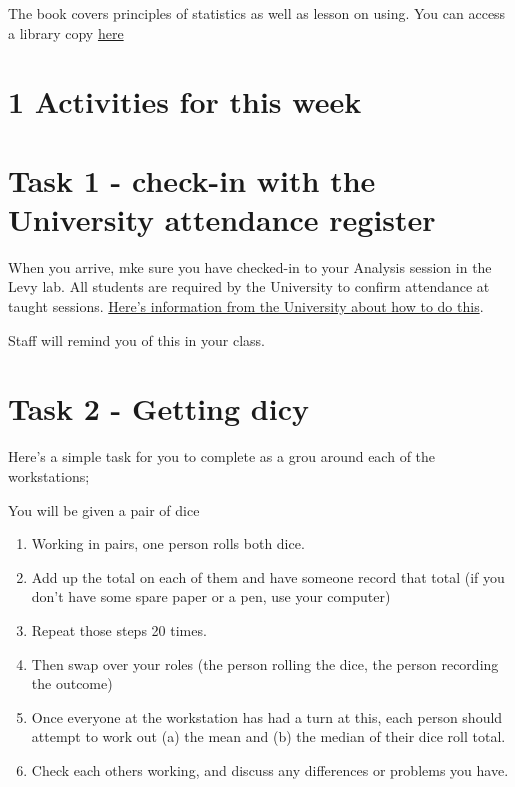 \documentclass[
]{book}
\begin{document}
The book covers principles of statistics as well as lesson on using. You
can access a library copy
\href{https://onesearch.lancaster-university.uk/permalink/f/cssk39/44LAN_ALMA_DS51180136050001221}{here}\\

\hypertarget{activities-for-this-week}{%
\section{1 Activities for this week}\label{activities-for-this-week}}

\hypertarget{task-1---check-in-with-the-university-attendance-register}{%
\section{Task 1 - check-in with the University attendance register}\label{task-1---check-in-with-the-university-attendance-register}}

When you arrive, mke sure you have checked-in to your Analysis session
in the Levy lab. All students are required by the University to confirm
attendance at taught sessions. \href{https://www.lancaster.ac.uk/student-and-education-services/check-in/}{Here's information from the University about how to do
this}.

Staff will remind you of this in your class.

\hypertarget{task-2---getting-dicy}{%
\section{Task 2 - Getting dicy}\label{task-2---getting-dicy}}

Here's a simple task for you to complete as a grou around each of the
workstations;

You will be given a pair of dice

\begin{enumerate}
\def\labelenumi{\arabic{enumi}.}
\item
  Working in pairs, one person rolls both dice.
\item
  Add up the total on each of them and have someone record that total (if you don't have some spare paper or a pen, use your computer)
\item
  Repeat those steps 20 times.
\item
  Then swap over your roles (the person rolling the dice, the person recording the outcome)
\item
  Once everyone at the workstation has had a turn at this, each person
  should attempt to work out (a) the mean and (b) the median of their
  dice roll total.
\item
  Check each others working, and discuss any differences or problems
  you have.
\end{enumerate}
\end{document}
